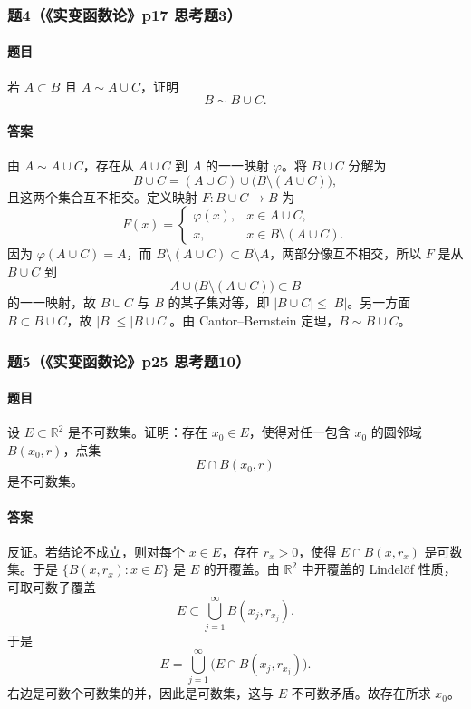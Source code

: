 \documentclass{article}
\newcommand{\R}{\mathbb{R}}
\begin{document}
	\subsubsection*{题4（《实变函数论》p17 思考题3）}
	\paragraph{题目}若 $A\subset B$ 且 $A\sim A\cup C$，证明
	\[
	B\sim B\cup C.
	\]
	
	\paragraph{答案}由 $A\sim A\cup C$，存在从 $A\cup C$ 到 $A$ 的一一映射 $\varphi$。将 $B\cup C$ 分解为
	\[
	B\cup C=(A\cup C)\cup\bigl(B\setminus(A\cup C)\bigr),
	\]
	且这两个集合互不相交。定义映射 $F:B\cup C\to B$ 为
	\[
	F(x)=
	\begin{cases}
		\varphi(x),&x\in A\cup C,\\
		x,&x\in B\setminus(A\cup C).
	\end{cases}
	\]
	因为 $\varphi(A\cup C)=A$，而 $B\setminus(A\cup C)\subset B\setminus A$，两部分像互不相交，所以 $F$ 是从 $B\cup C$ 到
	\[
	A\cup\bigl(B\setminus(A\cup C)\bigr)\subset B
	\]
	的一一映射，故 $B\cup C$ 与 $B$ 的某子集对等，即 $|B\cup C|\le |B|$。另一方面 $B\subset B\cup C$，故 $|B|\le |B\cup C|$。由 Cantor--Bernstein 定理，$B\sim B\cup C$。
	
	\subsubsection*{题5（《实变函数论》p25 思考题10）}
	\paragraph{题目}设 $E\subset\R^2$ 是不可数集。证明：存在 $x_0\in E$，使得对任一包含 $x_0$ 的圆邻域 $B(x_0,r)$，点集
	\[
	E\cap B(x_0,r)
	\]
	是不可数集。
	
	\paragraph{答案}反证。若结论不成立，则对每个 $x\in E$，存在 $r_x>0$，使得 $E\cap B(x,r_x)$ 是可数集。于是 $\{B(x,r_x):x\in E\}$ 是 $E$ 的开覆盖。由 $\R^2$ 中开覆盖的 Lindelöf 性质，可取可数子覆盖
	\[
	E\subset\bigcup_{j=1}^{\infty}B(x_j,r_{x_j}).
	\]
	于是
	\[
	E=\bigcup_{j=1}^{\infty}\bigl(E\cap B(x_j,r_{x_j})\bigr).
	\]
	右边是可数个可数集的并，因此是可数集，这与 $E$ 不可数矛盾。故存在所求 $x_0$。
	
\end{document}
